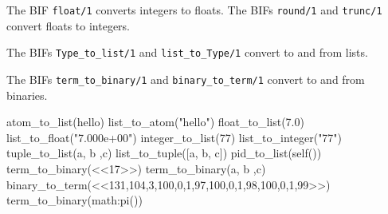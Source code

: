 The BIF \texttt{float/1} converts integers to floats. The BIFs
\texttt{round/1} and \texttt{trunc/1} convert floats to integers.

The BIFs \texttt{Type\_to\_list/1} and \texttt{list\_to\_Type/1}
convert to and from lists.

The BIFs \texttt{term\_to\_binary/1} and \texttt{binary\_to\_term/1}
convert to and from binaries.

\begin{erlang}
atom_to_list(hello)        %
list_to_atom("hello")      %
float_to_list(7.0)         %
list_to_float("7.000e+00") %
integer_to_list(77)        %
list_to_integer("77")      %
tuple_to_list({a, b ,c})   %
list_to_tuple([a, b, c])   %
pid_to_list(self())        %
term_to_binary(<<17>>)     %
term_to_binary({a, b ,c})  %
binary_to_term(<<131,104,3,100,0,1,97,100,0,1,98,100,0,1,99>>)  %
term_to_binary(math:pi())  %
\end{erlang}

